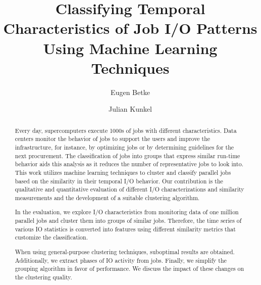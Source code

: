 \documentclass[]{llncs}
\begin{document}
\title{Classifying Temporal Characteristics of Job I/O Patterns Using Machine Learning Techniques}




\author{Eugen Betke  \and  Julian Kunkel}


\maketitle

\begin{abstract}
Every day, supercomputers execute 1000s of jobs with different characteristics.
Data centers monitor the behavior of jobs to support the users and improve the infrastructure, for instance, by optimizing jobs or by determining guidelines for the next procurement.
The classification of jobs into groups that express similar run-time behavior aids this analysis as it reduces the number of representative jobs to look into.
This work utilizes machine learning techniques to cluster and classify parallel jobs based on the similarity in their temporal I/O behavior.
Our contribution is the qualitative and quantitative evaluation of different I/O characterizations and similarity measurements and the development of a suitable clustering algorithm.

In the evaluation, we explore I/O characteristics from monitoring data of one million parallel jobs and cluster them into groups of similar jobs.
Therefore, the time series of various IO statistics is converted into features using different similarity metrics that customize the classification.

When using general-purpose clustering techniques, suboptimal results are obtained.
Additionally, we extract phases of IO activity from jobs.
Finally, we simplify the grouping algorithm in favor of performance.
We discuss the impact of these changes on the clustering quality.
\end{abstract}
\end{document}
